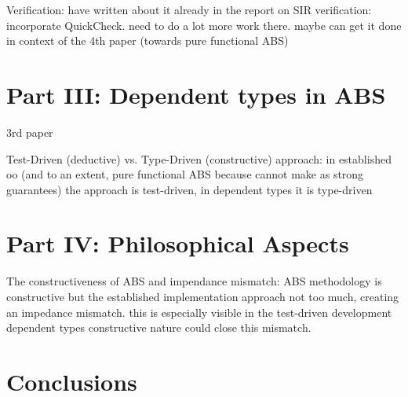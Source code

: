 Verification:
have written about it already in the report on SIR verification: incorporate QuickCheck. need to do a lot more work there. maybe can get it done in context of the 4th paper (towards pure functional ABS)

\section{Part III: Dependent types in ABS}
3rd paper

Test-Driven (deductive) vs. Type-Driven (constructive) approach: in established oo (and to an extent, pure functional ABS because cannot make as strong guarantees) the approach is test-driven, in dependent types it is type-driven

\section{Part IV: Philosophical Aspects}
The constructiveness of ABS and impendance mismatch: ABS methodology is constructive but the established implementation approach not too much, creating an impedance mismatch. this is especially visible in the test-driven development dependent types constructive nature could close this mismatch.

\section{Conclusions}